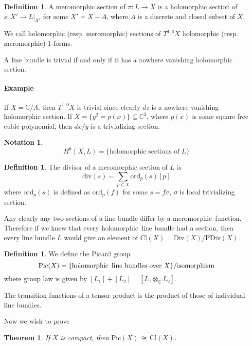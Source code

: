 \documentclass[12pt]{article}
\theoremstyle{plain}
\newtheorem{theorem}[equation]{Theorem}
\theoremstyle{definition}
\newtheorem{definition}[equation]{Definition}
\newtheorem{notation}[equation]{Notation}
\newcommand{\IC}{\mathbb{C}}
\newcommand\iso{{\, \cong \,}}
\newcommand\tensor{{\otimes}}
\newcommand{\<}{\langle}
\renewcommand{\>}{\rangle}
\newcommand{\ord}{\mathrm{ord}}
\newcommand{\Div}{\mathrm{Div}}
\newcommand{\PDiv}{\mathrm{PDiv}}
\renewcommand{\div}{\mathrm{div}}
\newcommand{\Cl}{\mathrm{Cl}}
\newcommand{\Pic}{\mathrm{Pic}}
\newcommand{\holo}{holomorphic \,}
\newcommand{\mero}{meromorphic \,}
\begin{document}
\begin{definition}
A meromorphic section of $\pi: L \to X$ is a holomorphic section of $s : X' \to L|_{X'}$ for some $X' = X - A$, where $A$ is a discrete and closed subset of $X$. 
\end{definition}

We call holomorphic (resp. meromorphic) sections of $T^{1, 0} X$ holomorphic (resp. meromorphic) 1-forms. 

A line bundle is trivial if and only if it has a nowhere vanishing holomorphic section. 

\paragraph{Example} If $X = \IC/\Lambda$, then $T^{1, 0}X$ is trivial since clearly $dz$ is a nowhere vanishing holomorphic section. If $X = \{ y^2 = p(x) \} \subseteq \IC^2$, where $p(x)$ is some square free cubic polynomial, then $dx/y$ is a trivializing section. 

\begin{notation}
$$H^0(X, L) = \{ \text{holomorphic sections of } L \}$$
\end{notation} 

\begin{definition}
The divisor of a meromorphic section of $L$ is 
$$ \div(s) = \sum_{ p \in X} \ord_p (s) [p] $$ 
where $\ord_p(s)$ is defined as $\ord_p(f)$ for some $s = f \sigma$, $\sigma$ is local trivializing section. 
\end{definition} 

Any clearly any two sections of a line bundle differ by a \mero function. Therefore if we knew that every \holo line bundle had a section, then every line bundle $L$ would give an element of $\Cl(X) = \Div(X)/\PDiv(X)$. 

\begin{definition}
We define the Picard group 
$$\Pic(X) = \{ \text{\holo line bundles over }X\}/\text{isomorphism} $$
where group law is given by $[L_1] + [L_2] = [L_1 \tensor_\IC L_2]$. 
\end{definition}

The transition functions of a tensor product is the product of those of individual line bundles. 

Now we wish to prove 
\begin{theorem}
\label{Picisocl}
If $X$ is compact, then $\Pic(X) \iso \Cl(X)$. 
\end{theorem}
\end{document}
